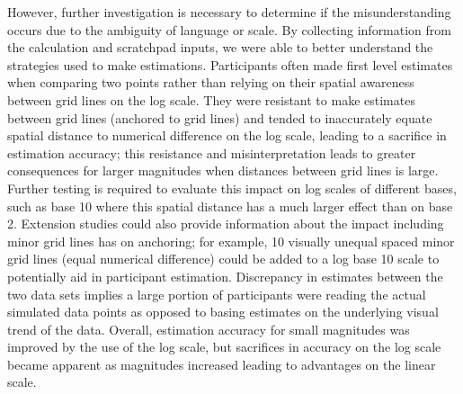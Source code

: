 \documentclass[print]{nuthesis}
\begin{document}
However, further investigation is necessary to determine if the misunderstanding occurs due to the ambiguity of language or scale.
By collecting information from the calculation and scratchpad inputs, we were able to better understand the strategies used to make estimations.
Participants often made first level estimates when comparing two points rather than relying on their spatial awareness between grid lines on the log scale.
They were resistant to make estimates between grid lines (anchored to grid lines) and tended to inaccurately equate spatial distance to numerical difference on the log scale, leading to a sacrifice in estimation accuracy; this resistance and misinterpretation leads to greater consequences for larger magnitudes when distances between grid lines is large.
Further testing is required to evaluate this impact on log scales of different bases, such as base 10 where this spatial distance has a much larger effect than on base 2.
Extension studies could also provide information about the impact including minor grid lines has on anchoring; for example, 10 visually unequal spaced minor grid lines (equal numerical difference) could be added to a log base 10 scale to potentially aid in participant estimation.
Discrepancy in estimates between the two data sets implies a large portion of participants were reading the actual simulated data points as opposed to basing estimates on the underlying visual trend of the data.
Overall, estimation accuracy for small magnitudes was improved by the use of the log scale, but sacrifices in accuracy on the log scale became apparent as magnitudes increased leading to advantages on the linear scale.
\end{document}
